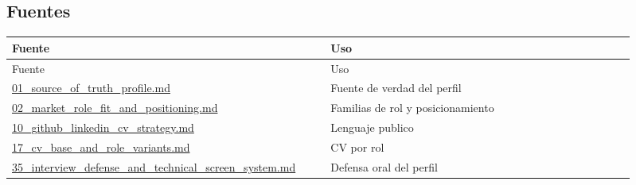 \subsection{Fuentes}


\begin{center}
\scriptsize
\begin{longtable}{>{\raggedright\arraybackslash}p{0.455\linewidth} >{\raggedright\arraybackslash}p{0.455\linewidth}}
\toprule
Fuente & Uso \\
\midrule
\endfirsthead
\toprule
Fuente & Uso \\
\midrule
\endhead
\href{file:///E:/Laboral/01_source_of_truth_profile.md}{01\_source\_of\_truth\_profile.md} & Fuente de verdad del perfil \\
\href{file:///E:/Laboral/02_market_role_fit_and_positioning.md}{02\_market\_role\_fit\_and\_positioning.md} & Familias de rol y posicionamiento \\
\href{file:///E:/Laboral/10_github_linkedin_cv_strategy.md}{10\_github\_linkedin\_cv\_strategy.md} & Lenguaje publico \\
\href{file:///E:/Laboral/17_cv_base_and_role_variants.md}{17\_cv\_base\_and\_role\_variants.md} & CV por rol \\
\href{file:///E:/Laboral/35_interview_defense_and_technical_screen_system.md}{35\_interview\_defense\_and\_technical\_screen\_system.md} & Defensa oral del perfil \\
\bottomrule
\end{longtable}
\end{center}
